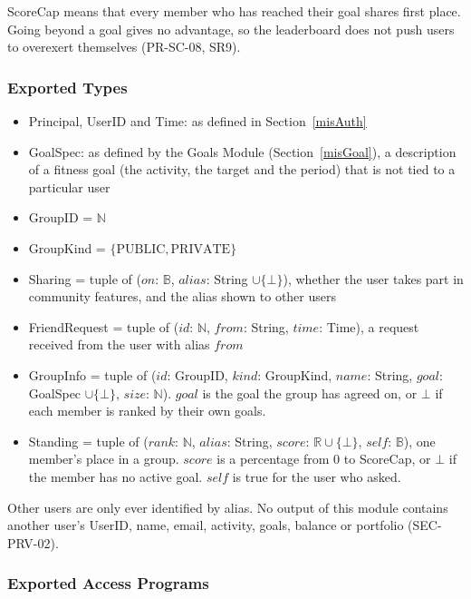 \documentclass[12pt, titlepage]{article}
\begin{document}
\noindent \textsf{ScoreCap} means that every member who has reached their
goal shares first place. Going beyond a goal gives no advantage, so the
leaderboard does not push users to overexert themselves (PR-SC-08, SR9).

\subsubsection{Exported Types}

\begin{itemize}
\item Principal, UserID and Time: as defined in Section~\ref{misAuth}
\item GoalSpec: as defined by the Goals Module (Section~\ref{misGoal}), a
  description of a fitness goal (the activity, the target and the period)
  that is not tied to a particular user
\item GroupID = $\mathbb{N}$
\item GroupKind = $\{\mathrm{PUBLIC}, \mathrm{PRIVATE}\}$
\item Sharing = tuple of ($\mathit{on}$: $\mathbb{B}$, $\mathit{alias}$:
  String $\cup \{\bot\}$), whether the user takes part in community
  features, and the alias shown to other users
\item FriendRequest = tuple of ($\mathit{id}$: $\mathbb{N}$,
  $\mathit{from}$: String, $\mathit{time}$: Time), a request received from
  the user with alias $\mathit{from}$
\item GroupInfo = tuple of ($\mathit{id}$: GroupID, $\mathit{kind}$:
  GroupKind, $\mathit{name}$: String, $\mathit{goal}$: GoalSpec $\cup
  \{\bot\}$, $\mathit{size}$: $\mathbb{N}$). $\mathit{goal}$ is the goal the
  group has agreed on, or $\bot$ if each member is ranked by their own goals.
\item Standing = tuple of ($\mathit{rank}$: $\mathbb{N}$, $\mathit{alias}$:
  String, $\mathit{score}$: $\mathbb{R} \cup \{\bot\}$, $\mathit{self}$:
  $\mathbb{B}$), one member's place in a group. $\mathit{score}$ is a
  percentage from 0 to \textsf{ScoreCap}, or $\bot$ if the member has no
  active goal. $\mathit{self}$ is true for the user who asked.
\end{itemize}

\noindent Other users are only ever identified by alias. No output of this
module contains another user's UserID, name, email, activity, goals, balance
or portfolio (SEC-PRV-02).

\subsubsection{Exported Access Programs}
\end{document}

